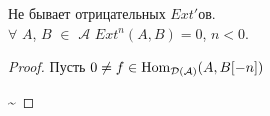 \documentclass[../main.tex]{subfiles}
\begin{document}
\begin{to_claim}
Не бывает отрицательных $Ext'$ов.\\
$\forall$ $A$, $B$ $\in$ $\mathcal{A}$ $Ext^n (A, B) = 0$, $n<0$.
\begin{proof}
Пусть $0 \neq f \in \operatorname{Hom}_{\mathcal{D(A)}}(A, B[-n])$
\bee
{}
\sim\text{ }
\eee
\end{proof}
\end{to_claim}
\end{document}
